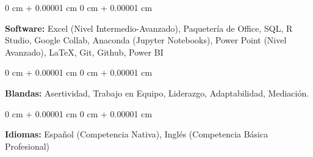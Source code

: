 \documentclass[10pt, letterpaper]{article}
\newenvironment{highlights}{
    \begin{itemize}[
        topsep=0.10 cm,
        parsep=0.10 cm,
        partopsep=0pt,
        itemsep=0pt,
        leftmargin=0 cm + 10pt
    ]
}{
    \end{itemize}
} %
\newenvironment{onecolentry}{
    \begin{adjustwidth}{
        0 cm + 0.00001 cm
    }{
        0 cm + 0.00001 cm
    }
}{
    \end{adjustwidth}
} %
\newenvironment{twocolentry}[2][]{
    \onecolentry
    \def\secondColumn{#2}
    \setcolumnwidth{\fill, 4.5 cm}
    \begin{paracol}{2}
}{
    \switchcolumn \raggedleft \secondColumn
    \end{paracol}
    \endonecolentry
} %
\begin{document}
        \vspace{0.2 cm}

        \begin{onecolentry}
            \textbf{Software:} Excel (Nivel Intermedio-Avanzado), Paquetería de Office, SQL, R Studio, Google Collab, Anaconda (Jupyter Notebooks), Power Point (Nivel Avanzado), LaTeX, Git, Github, Power BI
        \end{onecolentry}

        \vspace{0.2 cm}

        \begin{onecolentry}
            \textbf{Blandas:} Asertividad, Trabajo en Equipo, Liderazgo, Adaptabilidad, Mediación.
        \end{onecolentry}

        \vspace{0.2 cm}

        \begin{onecolentry}
            \textbf{Idiomas:} Español (Competencia Nativa), Inglés (Competencia Básica Profesional)
        \end{onecolentry}

        

\end{document}

